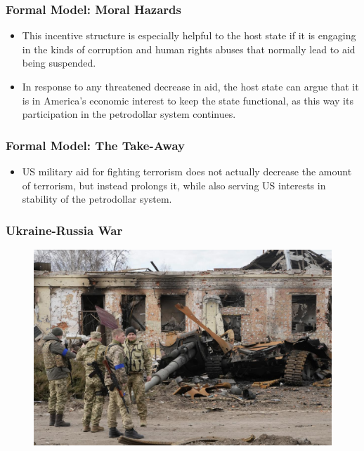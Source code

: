 \documentclass{beamer}
\begin{document}
\begin{frame} 
	\frametitle{\LARGE{Formal Model: Moral Hazards}}
	\begin{itemize}
		\item This incentive structure is especially helpful to the host state if it is engaging in the kinds of corruption and human rights abuses that normally lead to aid being suspended. \pause
		\item In response to any threatened decrease in aid, the host state can argue that it is in America's economic interest to keep the state functional, as this way its participation in the petrodollar system continues. 
	\end{itemize}
\end{frame}

\begin{frame} 
	\frametitle{\LARGE{Formal Model: The Take-Away}}
	\begin{itemize}
		\item US military aid for fighting terrorism does not actually decrease the amount of terrorism, but instead prolongs it, while also serving US interests in stability of the petrodollar system.
	\end{itemize}
\end{frame}

\begin{frame} 
	\frametitle{\LARGE{Ukraine-Russia War}}
	\begin{figure}[ht!]
		\centering
		\includegraphics[width=\textwidth,height=0.9\textheight,keepaspectratio]{Russia_Ukraine_War_33204.jpg-795e2.jpg}
	\end{figure}
\end{frame}
\end{document}
